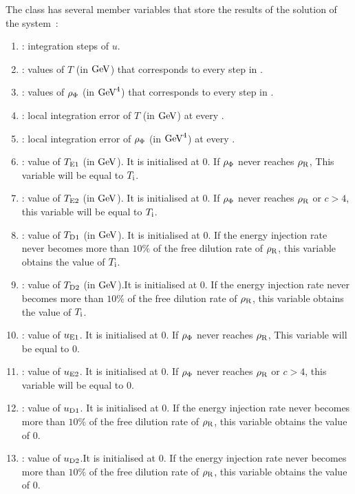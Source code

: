 \documentclass[11pt,a4paper]{article}
\begin{document}
The class  has several member variables that store the results of the solution of the system~:
%
\begin{enumerate}
	\item {}: integration steps of $u$.
	\item {}: values of $T$ (in ${\rm GeV}$) that corresponds to every step in .
	\item {}: values of $\rho_{\Phi}$ (in ${\rm GeV}^4$) that corresponds to every step in .
	\item {}: local integration error of $T$ (in ${\rm GeV}$) at every .
	\item {}: local integration error of $\rho_{\Phi}$ (in ${\rm GeV}^4$) at every .
	\item {}: value of $T_{\rm E1}{}$ (in ${\rm GeV}$). It is initialised at 0. If $\rho_{\Phi}$ never reaches $\rho_{\rm R}$, This variable will be equal to $T_{\rm i}{}$.
	\item {}: value of $T_{\rm E2}{}$ (in ${\rm GeV}$). It is initialised at 0. If $\rho_{\Phi}$ never reaches $\rho_{\rm R}$ or $c>4$, this variable will be equal to $T_{\rm i}{}$. 
	\item {}: value of $T_{\rm D1}{}$ (in ${\rm GeV}$). It is initialised at 0. If the energy injection rate never becomes more than $10\%$ of the free dilution rate of $\rho_{\rm R}$, this variable obtains the value of $T_{\rm i}{}$.
	\item {}: value of $T_{\rm D2}{}$ (in ${\rm GeV}$).It is initialised at 0. If the energy injection rate never becomes more than $10\%$ of the free dilution rate of $\rho_{\rm R}$, this variable obtains the value of $T_{\rm i}{}$.
	\item {}: value of $u_{\rm E1}{}$. It is initialised at 0. If $\rho_{\Phi}$ never reaches $\rho_{\rm R}$, This variable will be equal to $0$.
	\item {}: value of $u_{\rm E2}{}$. It is initialised at 0. If $\rho_{\Phi}$ never reaches $\rho_{\rm R}$  or $c>4$, this variable will be equal to $0$.
	\item {}: value of $u_{\rm D1}{}$. It is initialised at 0. If the energy injection rate never becomes more than $10\%$ of the free dilution rate of $\rho_{\rm R}$, this variable obtains the value of $0$.
	\item {}: value of $u_{\rm D2}{}$.It is initialised at 0. If the energy injection rate never becomes more than $10\%$ of the free dilution rate of $\rho_{\rm R}$, this variable obtains the value of $0$.	
\end{enumerate} 
\end{document}
